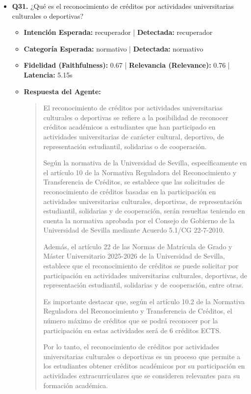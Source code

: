 \documentclass[12pt,a4paper,oneside]{report}
\begin{document}
\begin{itemize}
  
\item \textbf{Q31.} ¿Qué es el reconocimiento de créditos por actividades universitarias culturales o deportivas? \\
        \begin{itemize}
          \item \textbf{Intención Esperada:} recuperador | \textbf{Detectada:} recuperador
          \item \textbf{Categoría Esperada:} normativo | \textbf{Detectada:} normativo
          \item \textbf{Fidelidad (Faithfulness):} 0.67 | \textbf{Relevancia (Relevance):} 0.76 | \textbf{Latencia:} 5.15s
          \item \textbf{{Respuesta del Agente:}} \\
                \begin{quote}
El reconocimiento de créditos por actividades universitarias culturales o deportivas se refiere a la posibilidad de reconocer créditos académicos a estudiantes que han participado en actividades universitarias de carácter cultural, deportivo, de representación estudiantil, solidarias o de cooperación.

Según la normativa de la Universidad de Sevilla, específicamente en el artículo 10 de la Normativa Reguladora del Reconocimiento y Transferencia de Créditos, se establece que las solicitudes de reconocimiento de créditos basadas en la participación en actividades universitarias culturales, deportivas, de representación estudiantil, solidarias y de cooperación, serán resueltas teniendo en cuenta la normativa aprobada por el Consejo de Gobierno de la Universidad de Sevilla mediante Acuerdo 5.1/CG 22-7-2010.

Además, el artículo 22 de las Normas de Matrícula de Grado y Máster Universitario 2025-2026 de la Universidad de Sevilla, establece que el reconocimiento de créditos se puede solicitar por participación en actividades universitarias culturales, deportivas, de representación estudiantil, solidarias y de cooperación, entre otras.

Es importante destacar que, según el artículo 10.2 de la Normativa Reguladora del Reconocimiento y Transferencia de Créditos, el número máximo de créditos que se podrá reconocer por la participación en estas actividades será de 6 créditos ECTS.

Por lo tanto, el reconocimiento de créditos por actividades universitarias culturales o deportivas es un proceso que permite a los estudiantes obtener créditos académicos por su participación en actividades extracurriculares que se consideren relevantes para su formación académica. 


\end{quote}
\end{itemize}
\end{itemize}
\end{document}
